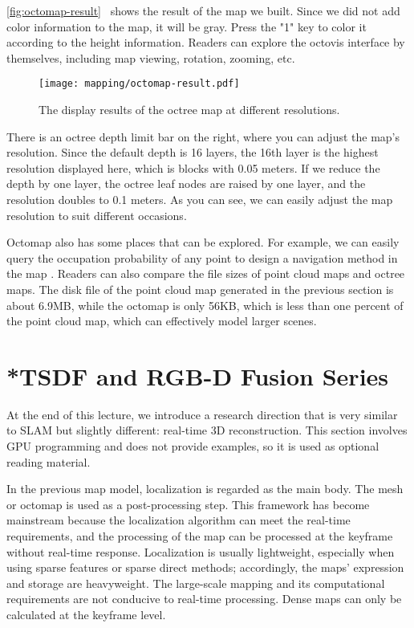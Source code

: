 \autoref{fig:octomap-result}~ shows the result of the map we built. Since we did not add color information to the map, it will be gray. Press the "1" key to color it according to the height information. Readers can explore the octovis interface by themselves, including map viewing, rotation, zooming, etc.

\begin{figure}[!htp]
	\centering
	\texttt{[image: mapping/octomap-result.pdf]}
	\caption{The display results of the octree map at different resolutions.}
	\label{fig:octomap-result}
\end{figure}

There is an octree depth limit bar on the right, where you can adjust the map's resolution. Since the default depth is 16 layers, the 16th layer is the highest resolution displayed here, which is blocks with 0.05 meters. If we reduce the depth by one layer, the octree leaf nodes are raised by one layer, and the resolution doubles to 0.1 meters. As you can see, we can easily adjust the map resolution to suit different occasions.

Octomap also has some places that can be explored. For example, we can easily query the occupation probability of any point to design a navigation method in the map {\cite{Burri2015}}. Readers can also compare the file sizes of point cloud maps and octree maps. The disk file of the point cloud map generated in the previous section is about 6.9MB, while the octomap is only 56KB, which is less than one percent of the point cloud map, which can effectively model larger scenes.

\section{*TSDF and RGB-D Fusion Series}
At the end of this lecture, we introduce a research direction that is very similar to SLAM but slightly different: real-time 3D reconstruction. This section involves GPU programming and does not provide examples, so it is used as optional reading material.

In the previous map model, localization is regarded as the main body. The mesh or octomap is used as a post-processing step. This framework has become mainstream because the localization algorithm can meet the real-time requirements, and the processing of the map can be processed at the keyframe without real-time response. Localization is usually lightweight, especially when using sparse features or sparse direct methods; accordingly, the maps' expression and storage are heavyweight. The large-scale mapping and its computational requirements are not conducive to real-time processing. Dense maps can only be calculated at the keyframe level.

